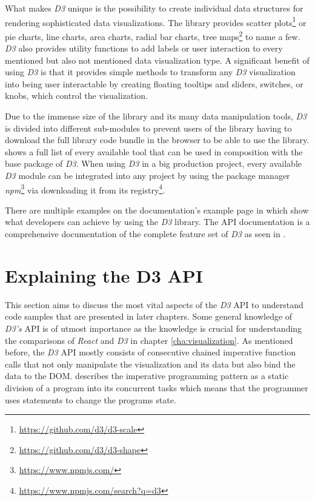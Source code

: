 What makes \emph{D3} unique is the possibility to create individual data structures for rendering sophisticated data visualizations. The library provides scatter plots\footnote{\url{https://github.com/d3/d3-scale}} or pie charts, line charts, area charts, radial bar charts, tree maps\footnote{\url{https://github.com/d3/d3-shape}} to name a few. \emph{D3} also provides utility functions to add labels or user interaction to every mentioned but also not mentioned data visualization type. A significant benefit of using \emph{D3} is that it provides simple methods to transform any \emph{D3} visualization into being user interactable by creating floating tooltips and sliders, switches, or knobs, which control the visualization.

Due to the immense size of the library and its many data manipulation tools, \emph{D3} is divided into different sub-modules to prevent users of the library having to download the full library code bundle in the browser to be able to use the library. \cite{D3Github} shows a full list of every available tool that can be used in composition with the base package of \emph{D3}. When using \emph{D3} in a big production project, every available \emph{D3} module can be integrated into any project by using the package manager \emph{npm}\footnote{\url{https://www.npmjs.com/}} via downloading it from its registry\footnote{\url{https://www.npmjs.com/search?q=d3}}.

\begin{emergency}{1em}
There are multiple examples on the documentation's example page in \cite{D3Examples} which show what developers can achieve by using the \emph{D3} library. The API documentation is a comprehensive documentation of the complete feature set of \emph{D3} as seen in \cite{D3Github}. %
\end{emergency}


\section{Explaining the D3 API} 

This section aims to discuss the most vital aspects of the \emph{D3} API to understand code samples that are presented in later chapters. Some general knowledge of \emph{D3's} API is of utmost importance as the knowledge is crucial for understanding the comparisons of \emph{React} and \emph{D3} in chapter \ref{cha:visualization}. As mentioned before, the \emph{D3} API mostly consists of consecutive chained imperative function calls that not only manipulate the visualization and its data but also bind the data to the DOM. \cite[p.\ 625]{prgLngDesignImpl} describes the imperative programming pattern as a static division of a program into its concurrent tasks which means that the programmer uses statements to change the programs state. 


